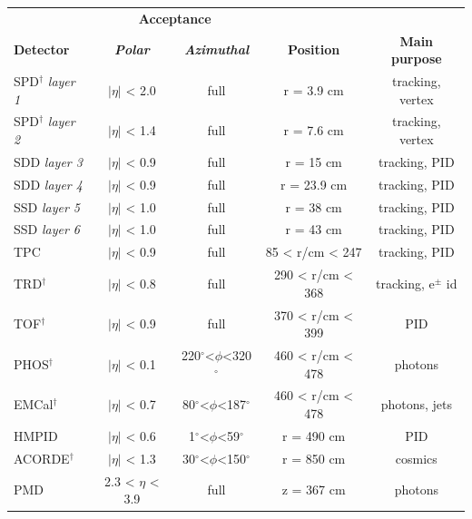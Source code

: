 \begingroup
\setlength{\tabcolsep}{6pt} %
\renewcommand{\arraystretch}{1.5} %
\begin{table}[!tp]\small
\centering
	\begin{tabular*}{\textwidth}{@{\extracolsep{\fill}}lcccc}
	\toprule
		     & \multicolumn{2}{c}{\normalsize{\textbf{Acceptance}}} \\
	\textbf{\normalsize{Detector}} & \textit{\textbf{Polar}} & \textit{\textbf{Azimuthal}} & \textbf{\normalsize{Position}} & \textbf{\normalsize{Main purpose}}	 \\
    \midrule
	SPD$^{\dagger}$	\textit{layer 1}     & $|\eta|$ < 2.0	  & full			& r = 3.9 cm		& tracking, vertex\\
	SPD$^{\dagger}$	\textit{layer 2}     & $|\eta|$ < 1.4	  & full			& r = 7.6 cm		& tracking, vertex\\
	SDD	\textit{ layer 3}		         & $|\eta|$ < 0.9	  & full			& r = 15 cm		    & tracking, PID\\
	SDD	\textit{ layer 4}		         & $|\eta|$ < 0.9	  & full			& r = 23.9 cm	    & tracking, PID\\
    SSD	\textit{ layer 5}			     & $|\eta|$ < 1.0	  & full			& r = 38 cm		    & tracking, PID\\
    SSD	\textit{ layer 6}			     & $|\eta|$ < 1.0	  & full			& r = 43 cm		    & tracking, PID\\
    TPC	                                 & $|\eta|$ < 0.9     & full			& 85 < r/cm < 247   & tracking, PID \\
    TRD$^{\dagger}$	                     & $|\eta|$ < 0.8     & full			& 290 < r/cm < 368  & tracking, e$^{\pm}$ id \\
    TOF$^{\dagger}$	                     & $|\eta|$ < 0.9     & full			& 370 < r/cm < 399  & PID \\
    PHOS$^{\dagger}$                     & $|\eta|$ < 0.1    & 220$^{\circ}$<$\phi$<320$^{\circ}$	& 460 < r/cm < 478 & photons \\
    EMCal$^{\dagger}$                    & $|\eta|$ < 0.7     & 80$^{\circ}$<$\phi$<187$^{\circ}$	& 460 < r/cm < 478 & photons, jets \\
    HMPID                                & $|\eta|$ < 0.6     & 1$^{\circ}$<$\phi$<59$^{\circ}$		& r = 490 cm       & PID \\
    ACORDE$^{\dagger}$                   & $|\eta|$ < 1.3     & 30$^{\circ}$<$\phi$<150$^{\circ}$   & r = 850 cm       & cosmics \\
    \midrule
    PMD		                 & 2.3 < $\eta$ < 3.9   & full			& z = 367 cm		& photons\\

\end{tabular*}
\end{table}
